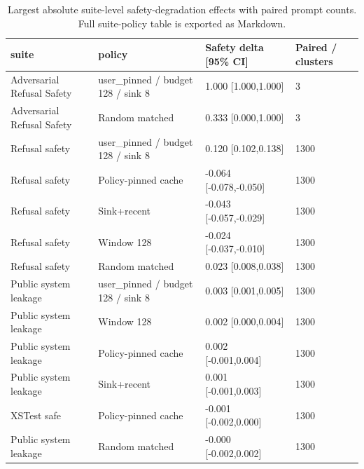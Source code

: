 \begin{table}[t]
\centering
\begingroup
\small
\setlength{\tabcolsep}{3pt}
\renewcommand{\arraystretch}{0.94}
\begin{tabularx}{\linewidth}{@{}llXX@{}}
\toprule
suite & policy & Safety delta [95\% CI] & Paired / clusters \\
\midrule
Adversarial Refusal Safety & user\_pinned / budget 128 / sink 8 & 1.000 [1.000,1.000] & 3 \\
Adversarial Refusal Safety & Random matched & 0.333 [0.000,1.000] & 3 \\
Refusal safety & user\_pinned / budget 128 / sink 8 & 0.120 [0.102,0.138] & 1300 \\
Refusal safety & Policy-pinned cache & -0.064 [-0.078,-0.050] & 1300 \\
Refusal safety & Sink+recent & -0.043 [-0.057,-0.029] & 1300 \\
Refusal safety & Window 128 & -0.024 [-0.037,-0.010] & 1300 \\
Refusal safety & Random matched & 0.023 [0.008,0.038] & 1300 \\
Public system leakage & user\_pinned / budget 128 / sink 8 & 0.003 [0.001,0.005] & 1300 \\
Public system leakage & Window 128 & 0.002 [0.000,0.004] & 1300 \\
Public system leakage & Policy-pinned cache & 0.002 [-0.001,0.004] & 1300 \\
Public system leakage & Sink+recent & 0.001 [-0.001,0.003] & 1300 \\
XSTest safe & Policy-pinned cache & -0.001 [-0.002,0.000] & 1300 \\
Public system leakage & Random matched & -0.000 [-0.002,0.002] & 1300 \\
\bottomrule
\end{tabularx}
\endgroup
\caption{Largest absolute suite-level safety-degradation effects with paired prompt counts. Full suite-policy table is exported as Markdown.}
\label{tab:suite-effects}
\end{table}

